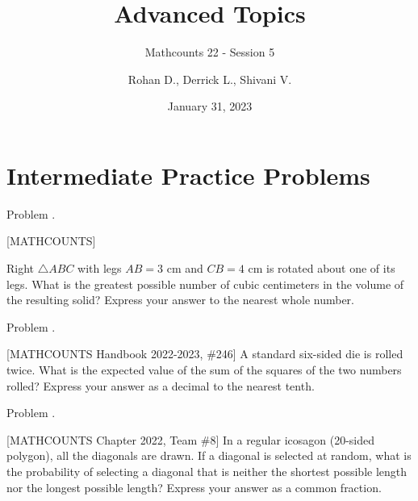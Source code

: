 \documentclass[9pt]{beamer}
\title{Advanced Topics}
\subtitle{Mathcounts 22 - Session 5}
\author{Rohan D., Derrick L., Shivani V.}
\institute{BISV Mathcounts Club 22}
\date{January 31, 2023}
\newcounter{problem}[section]
\begin{document}
\begin{frame}
    \titlepage        
\end{frame}

\setcounter{section}{2}
\section{Intermediate Practice Problems}
\begin{frame}[t, fragile]{Problem \thesection.\theproblem}
    \begin{block}{}[MATHCOUNTS]

 Right $\triangle ABC$ with legs $AB=3$ cm and $CB=4$ cm is rotated about one of its legs. What is the greatest possible number of cubic centimeters in the volume of the resulting solid? Express your answer to the nearest whole number.
	
	
    \end{block}
\end{frame}

\begin{frame}[t, fragile]{Problem \thesection.\theproblem}
    \begin{block}{}[MATHCOUNTS Handbook 2022-2023, \#246]
    A standard six-sided die is rolled twice. What is the expected value of the sum of the squares of the two numbers rolled? Express your answer as a decimal to the nearest tenth.
    
	
    \end{block}
\end{frame}


\begin{frame}[t, fragile]{Problem \thesection.\theproblem}
    \begin{block}{}[MATHCOUNTS Chapter 2022, Team \#8]
    In a regular icosagon (20-sided polygon), all the diagonals are drawn. If a diagonal is selected at random, what is the probability of selecting a diagonal that is neither the shortest possible length nor the longest possible length? Express your answer as a common fraction.
    
	
    \end{block}
\end{frame}
\end{document}
